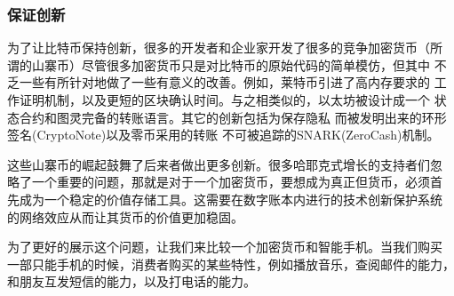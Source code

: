 \documentclass[letterpaper]{article}
\begin{document}
\subsubsection{保证创新}
为了让比特币保持创新，很多的开发者和企业家开发了很多的竞争加密货币（所
  谓的山寨币）尽管很多加密货币只是对比特币的原始代码的简单模仿，但其中
不乏一些有所针对地做了一些有意义的改善。例如，莱特币引进了高内存要求的
工作证明机制，以及更短的区块确认时间。与之相类似的，以太坊被设计成一个
状态合约和图灵完备的转账语言\cite{Ethereum}。其它的创新包括为保存隐私
而被发明出来的环形签名(CryptoNote)\cite{CryptoNote}以及零币采用的转账
不可被追踪的SNARK(ZeroCash)\cite{Zerocash}机制。

这些山寨币的崛起鼓舞了后来者做出更多创新。很多哈耶克式增长的支持者们忽
略了一个重要的问题，那就是对于一个加密货币，要想成为真正但货币，必须首
先成为一个稳定的价值存储工具。这需要在数字账本内进行的技术创新保护系统
的网络效应从而让其货币的价值更加稳固。


为了更好的展示这个问题，让我们来比较一个加密货币和智能手机。当我们购买
一部只能手机的时候，消费者购买的某些特性，例如播放音乐，查阅邮件的能力，
和朋友互发短信的能力，以及打电话的能力。
\end{document}
